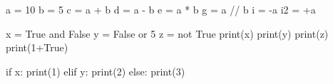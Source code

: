 


\begin{python}
a = 10
b = 5
c = a + b
d = a - b
e = a * b
g = a // b
i = -a
i2 = +a

x = True and False
y = False or 5
z = not True
print(x)
print(y)
print(z)
print(1+True)

if x:
    print(1)
elif y:
    print(2)
else:
    print(3)
\end{python}

\bye

